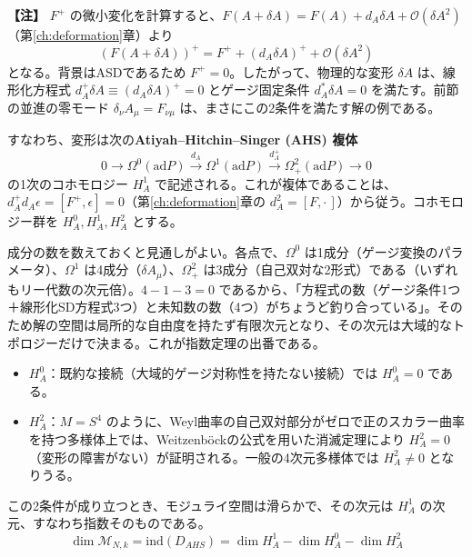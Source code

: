 \documentclass[uplatex, dvipdfmx, book]{jsbook}
\newenvironment{note}{\vspace{1ex}\par\footnotesize\noindent\textbf{【注】}}{\par\vspace{1ex}}
\begin{document}
\begin{note}
$F^+$ の微小変化を計算すると、$F(A + \delta A) = F(A) + d_A\delta A + \mathcal{O}(\delta A^2)$（第\ref{ch:deformation}章）より
\begin{equation*}
    (F(A+\delta A))^+ = F^+ + (d_A \delta A)^+ + \mathcal{O}(\delta A^2)
\end{equation*}
となる。背景はASDであるため $F^+ = 0$。したがって、物理的な変形 $\delta A$ は、線形化方程式 $d_A^+ \delta A \equiv (d_A\delta A)^+ = 0$ とゲージ固定条件 $d_A^* \delta A = 0$ を満たす。前節の並進の零モード $\delta_\nu A_\mu = F_{\nu\mu}$ は、まさにこの2条件を満たす解の例である。
\end{note}

すなわち、変形は次の\textbf{Atiyah--Hitchin--Singer (AHS) 複体}
\begin{equation}
    0 \to \Omega^0(\mathrm{ad}P) \xrightarrow{d_A} \Omega^1(\mathrm{ad}P) \xrightarrow{d_A^+} \Omega^2_+(\mathrm{ad}P) \to 0
\end{equation}
の1次のコホモロジー $H^1_A$ で記述される。これが複体であることは、$d_A^+ d_A \epsilon = [F^+, \epsilon] = 0$（第\ref{ch:deformation}章の $d_A^2 = [F, \cdot\,]$）から従う。コホモロジー群を $H^0_A, H^1_A, H^2_A$ とする。

成分の数を数えておくと見通しがよい。各点で、$\Omega^0$ は1成分（ゲージ変換のパラメータ）、$\Omega^1$ は4成分（$\delta A_\mu$）、$\Omega^2_+$ は3成分（自己双対な2形式）である（いずれもリー代数の次元倍）。$4 - 1 - 3 = 0$ であるから、「方程式の数（ゲージ条件1つ＋線形化SD方程式3つ）と未知数の数（4つ）がちょうど釣り合っている」。そのため解の空間は局所的な自由度を持たず有限次元となり、その次元は大域的なトポロジーだけで決まる。これが指数定理の出番である。

\begin{itemize}
    \item \textbf{$H^0_A$}：既約な接続（大域的ゲージ対称性を持たない接続）では $H^0_A = 0$ である。
    \item \textbf{$H^2_A$}：$M = S^4$ のように、Weyl曲率の自己双対部分がゼロで正のスカラー曲率を持つ多様体上では、Weitzenb\"ockの公式を用いた消滅定理により $H^2_A = 0$（変形の障害がない）が証明される。一般の4次元多様体では $H^2_A \neq 0$ となりうる。
\end{itemize}
この2条件が成り立つとき、モジュライ空間は滑らかで、その次元は $H^1_A$ の次元、すなわち指数そのものである。
\begin{equation}
    \dim \mathcal{M}_{N, k} = \mathrm{ind}(D_{AHS}) = \dim H^1_A - \dim H^0_A - \dim H^2_A
\end{equation}
\end{document}
